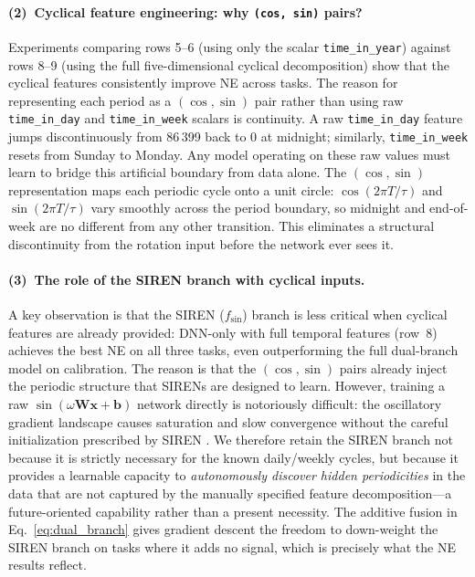 \documentclass{article}
\begin{document}
\paragraph{(2)~Cyclical feature engineering: why \texttt{(cos, sin)} pairs?}
Experiments comparing rows 5--6 (using only the scalar \texttt{time\_in\_year})
against rows 8--9 (using the full five-dimensional cyclical decomposition)
show that the cyclical features consistently improve NE across tasks. The
reason for representing each period as a $(\cos, \sin)$ pair rather than
using raw \texttt{time\_in\_day} and \texttt{time\_in\_week} scalars is
continuity. A raw \texttt{time\_in\_day} feature jumps discontinuously from
86\,399 back to 0 at midnight; similarly, \texttt{time\_in\_week} resets
from Sunday to Monday. Any model operating on these raw values must learn
to bridge this artificial boundary from data alone. The $(\cos, \sin)$
representation maps each periodic cycle onto a unit circle:
$\cos(2\pi T/\tau)$ and $\sin(2\pi T/\tau)$ vary smoothly across the period
boundary, so midnight and end-of-week are no different from any other
transition. This eliminates a structural discontinuity from the rotation
input before the network ever sees it.

\paragraph{(3)~The role of the SIREN branch with cyclical inputs.}
A key observation is that the SIREN ($f_{\mathrm{sin}}$) branch is less
critical when cyclical features are already provided: DNN-only with full
temporal features (row~8) achieves the best NE on all three tasks, even
outperforming the full dual-branch model on calibration. The reason is that
the $(\cos,\sin)$ pairs already inject the periodic structure that SIRENs
are designed to learn. However, training a raw $\sin(\omega \mathbf{W}
\mathbf{x} + \mathbf{b})$ network directly is notoriously difficult: the
oscillatory gradient landscape causes saturation and slow convergence without
the careful initialization prescribed by SIREN \citep{sitzmann2020siren}.
We therefore retain the SIREN branch not because it is strictly necessary for
the known daily/weekly cycles, but because it provides a learnable capacity
to \emph{autonomously discover hidden periodicities} in the data that are
not captured by the manually specified feature decomposition---a
future-oriented capability rather than a present necessity. The additive
fusion in Eq.~\eqref{eq:dual_branch} gives gradient descent the freedom to
down-weight the SIREN branch on tasks where it adds no signal, which is
precisely what the NE results reflect.
\end{document}
